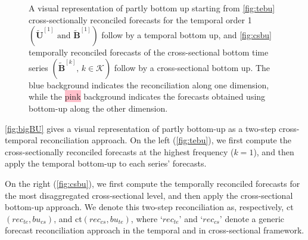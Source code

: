 \documentclass[a4paper,11pt]{article}
\newcommand{\Bvet}{\bm{B}}
\newcommand{\Uvet}{\bm{U}}
\theoremstyle{definition}
\begin{document}
\begin{figure}[!b]
\begin{subfigure}[b]{0.49\textwidth}
{}
		\label{fig:csbu}
	\end{subfigure}
	\vspace{-1cm}
	\caption{A visual representation of partly bottom up starting from \eqref{fig:tebu} cross-sectionally reconciled forecasts for the temporal order 1 $\left(\widetilde{\Uvet}^{[1]}\mbox{ and }\widetilde{\Bvet}^{[1]}\right)$ follow by a temporal bottom up, and \eqref{fig:csbu} temporally reconciled forecasts of the cross-sectional bottom time series $\left(\widetilde{\Bvet}^{[k]}, \, k\in \mathcal{K}\right)$ follow by a cross-sectional bottom up. The \colorbox{mybluehl}{blue} background indicates the reconciliation along one dimension, while the \colorbox{pink}{pink} background indicates the forecasts obtained using bottom-up along the other dimension.}
	\label{fig:bigBU}
\end{figure}

\autoref{fig:bigBU} gives a visual representation of partly bottom-up as a two-step cross-temporal reconciliation approach. On the left (\autoref{fig:tebu}), we first compute the cross-sectionally reconciled forecasts at the highest frequency ($k = 1$), and then apply the temporal bottom-up to each series' forecasts.

On the right (\autoref{fig:csbu}), we first compute the temporally reconciled forecasts for the most disaggregated cross-sectional level, and then apply the cross-sectional bottom-up approach. We denote this two-step reconciliation as, respectively, ct$(rec_{te},bu_{cs})$, and ct$(rec_{cs},bu_{te})$, where ‘$rec_{te}$’ and ‘$rec_{cs}$’ denote a generic forecast reconciliation approach in the temporal and in cross-sectional framework.
\end{document}

